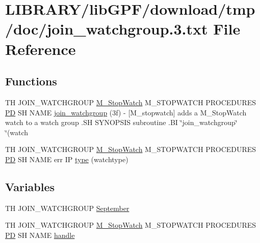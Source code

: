 \hypertarget{join__watchgroup_83_8txt}{}\section{L\+I\+B\+R\+A\+R\+Y/lib\+G\+P\+F/download/tmp/doc/join\+\_\+watchgroup.3.txt File Reference}
\label{join__watchgroup_83_8txt}
\subsection*{Functions}
\begin{DoxyCompactItemize}
\item 
TH J\+O\+I\+N\+\_\+\+W\+A\+T\+C\+H\+G\+R\+O\+UP \hyperlink{option__stopwatch_83_8txt_aa2011fc45a5e502e87ee50996a8a9305}{M\+\_\+\+Stop\+Watch} M\+\_\+\+S\+T\+O\+P\+W\+A\+T\+CH P\+R\+O\+C\+E\+D\+U\+R\+ES \hyperlink{what__overview_81_8txt_a85f26da5a4481fbdb0d9c79f2b94de3e}{PD} SH N\+A\+ME \hyperlink{join__watchgroup_83_8txt_ac3b8dababa54df484eadaefd83766987}{join\+\_\+watchgroup} (3f) -\/ \mbox{[}\+M\+\_\+stopwatch\mbox{]} adds a M\+\_\+\+Stop\+Watch watch to a watch group .\+S\+H S\+Y\+N\+O\+P\+S\+I\+S subroutine .\+B\+I \char`\"{}join\+\_\+watchgroup\char`\"{} \char`\"{}(watch
\item 
TH J\+O\+I\+N\+\_\+\+W\+A\+T\+C\+H\+G\+R\+O\+UP \hyperlink{option__stopwatch_83_8txt_aa2011fc45a5e502e87ee50996a8a9305}{M\+\_\+\+Stop\+Watch} M\+\_\+\+S\+T\+O\+P\+W\+A\+T\+CH P\+R\+O\+C\+E\+D\+U\+R\+ES \hyperlink{what__overview_81_8txt_a85f26da5a4481fbdb0d9c79f2b94de3e}{PD} SH N\+A\+ME err IP \hyperlink{join__watchgroup_83_8txt_a88f3702cb290b5d675ea8ffcbe5d0048}{type} (watchtype)
\end{DoxyCompactItemize}
\subsection*{Variables}
\begin{DoxyCompactItemize}
\item 
TH J\+O\+I\+N\+\_\+\+W\+A\+T\+C\+H\+G\+R\+O\+UP \hyperlink{join__watchgroup_83_8txt_ab585e085cf3d3bd96c1d9e01f9a0839b}{September}
\item 
TH J\+O\+I\+N\+\_\+\+W\+A\+T\+C\+H\+G\+R\+O\+UP \hyperlink{option__stopwatch_83_8txt_aa2011fc45a5e502e87ee50996a8a9305}{M\+\_\+\+Stop\+Watch} M\+\_\+\+S\+T\+O\+P\+W\+A\+T\+CH P\+R\+O\+C\+E\+D\+U\+R\+ES \hyperlink{what__overview_81_8txt_a85f26da5a4481fbdb0d9c79f2b94de3e}{PD} SH N\+A\+ME \hyperlink{join__watchgroup_83_8txt_a85bcd8db808fcc8cfc2b3e95e1e7d847}{handle}
\end{DoxyCompactItemize}


